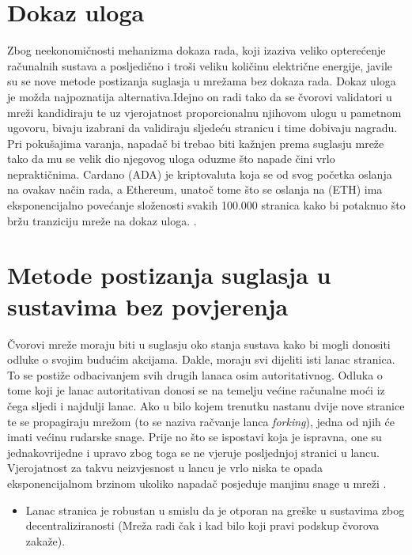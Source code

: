 \documentclass[utf8, zavrsni]{fer}
\begin{document}
\section{Dokaz uloga}
Zbog neekonomičnosti mehanizma dokaza rada, koji izaziva veliko opterećenje računalnih sustava a posljedično i troši veliku količinu električne energije, javile su se nove metode postizanja suglasja u mrežama bez dokaza rada. Dokaz uloga\footnotemark {}
je možda najpoznatija alternativa.Idejno on radi tako da se čvorovi validatori u mreži kandidiraju te uz vjerojatnost proporcionalnu njihovom ulogu u pametnom ugovoru, bivaju izabrani da validiraju sljedeću stranicu i time dobivaju nagradu. Pri pokušajima varanja, napadač bi trebao biti kažnjen prema suglasju mreže tako da mu se velik dio njegovog uloga oduzme što napade čini vrlo nepraktičnima. Cardano (ADA)\footnotemark \footnotetext{} je kriptovaluta koja se od svog početka oslanja na ovakav način rada, a Ethereum, unatoč tome što se oslanja na  (ETH) ima eksponencijalno povećanje složenosti svakih 100.000 stranica kako bi potaknuo što bržu tranziciju mreže na dokaz uloga. \cite{wood2014ethereum}.

\section{Metode postizanja suglasja u sustavima bez povjerenja}
Čvorovi mreže moraju biti u suglasju oko stanja sustava kako bi mogli donositi odluke o svojim budućim akcijama. Dakle, moraju svi dijeliti isti lanac stranica. To se postiže odbacivanjem svih drugih lanaca osim autoritativnog. Odluka o tome koji je lanac autoritativan donosi se na temelju većine računalne moći iz čega sljedi i najdulji lanac. Ako u bilo kojem trenutku nastanu dvije nove stranice te se propagiraju mrežom (to se naziva račvanje lanca \textit{forking}), jedna od njih će imati većinu rudarske snage. Prije no što se ispostavi koja je ispravna, one su jednakovrijedne i upravo zbog toga se ne vjeruje posljednjoj stranici u lancu. Vjerojatnost za takvu neizvjesnost u lancu je vrlo niska te opada eksponencijalnom brzinom ukoliko napadač posjeduje manjinu snage u mreži \cite{btc, satoshi}.
\begin{itemize}
	\item Lanac stranica je robustan u smislu da je otporan na greške u sustavima zbog decentraliziranosti (Mreža radi čak i kad bilo koji pravi podskup čvorova zakaže).
\end{itemize}
\end{document}
